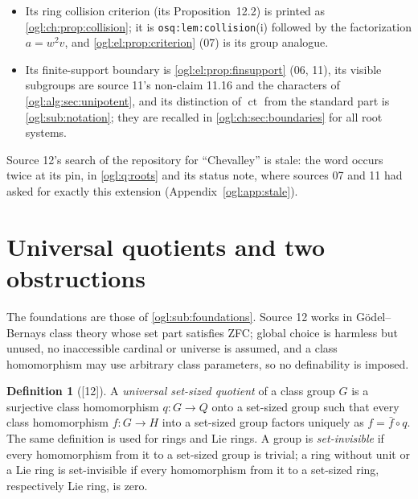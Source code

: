 \documentclass[11pt,oneside]{article}
\numberwithin{equation}{section}
\theoremstyle{definition}
\newtheorem{definition}[definition]{Definition}
\theoremstyle{remark}
\newcommand{\Q}{\mathbb Q}
\newcommand{\ct}{\operatorname{ct}}
\newcommand{\src}[1]{\textup{\textsf{\small[#1]}}}
\newcommand{\replabel}[1]{\nolinkurl{#1}}
\begin{document}
\begin{itemize}[leftmargin=*]
second route (\cref{ogl:ch:sec:rankone}). Its free-product description of the
kernel (its Corollary~10.2) is \cref{ogl:el:thm:freeproduct}; its equivariant
additive functional (its Lemma~10.3) is \cref{ogl:el:lem:functional} with
values in $K_D$ instead of $\Q$; its residual countability and the
nonexistence of a universal quotient in rank one (its Theorem~10.4) are
\cref{ogl:el:thm:countable,ogl:el:cor:nouniversal}. Its countable target
$G_D*_{C_D}(K_D\rtimes C_D)$ is, for $K_D=\Q$, isomorphic to 07's
target \eqref{ogl:el:eq:targetamalgam}; the two routes use the same mechanism.
\item Its ring collision criterion (its Proposition~12.2) is printed as
\cref{ogl:ch:prop:collision}; it is \replabel{osq:lem:collision}(i) followed by
the factorization $a=w^2v$, and \cref{ogl:el:prop:criterion} (07) is its group
analogue.
\item Its finite-support boundary is \cref{ogl:el:prop:finsupport} (06, 11), its
visible subgroups are source 11's non-claim 11.16 and the characters of
\cref{ogl:alg:sec:unipotent}, and its distinction of $\ct$ from the standard
part is \cref{ogl:sub:notation}; they are recalled in
\cref{ogl:ch:sec:boundaries} for all root systems.
\end{itemize}
Source 12's search of the repository for ``Chevalley'' is stale: the word
occurs twice at its pin, in \cref{ogl:q:roots} and its status note, where
sources 07 and 11 had asked for exactly this extension
(Appendix~\ref{ogl:app:stale}).

\section{Universal quotients and two obstructions}\label{ogl:ch:sec:universal}

The foundations are those of \cref{ogl:sub:foundations}. Source 12 works in
G\"odel--Bernays class theory whose set part satisfies ZFC; global choice is
harmless but unused, no inaccessible cardinal or universe is assumed, and a
class homomorphism may use arbitrary class parameters, so no definability is
imposed.

\begin{definition}[\src{12}]\label{ogl:ch:def:universal}
A \emph{universal set-sized quotient} of a class group $G$ is a surjective class
homomorphism $q:G\to Q$ onto a set-sized group such that every class
homomorphism $f:G\to H$ into a set-sized group factors uniquely as
$f=\bar f\circ q$. The same definition is used for rings and Lie rings. A group
is \emph{set-invisible} if every homomorphism from it to a set-sized group is
trivial; a ring without unit or a Lie ring is set-invisible if every
homomorphism from it to a set-sized ring, respectively Lie ring, is zero.
\end{definition}
\end{document}
